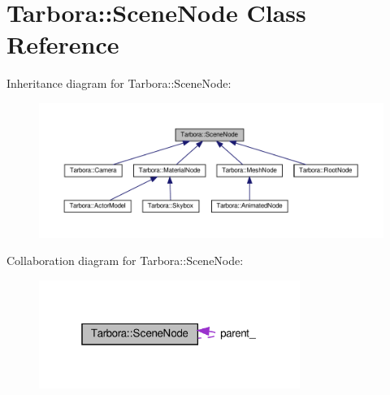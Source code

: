 \hypertarget{classTarbora_1_1SceneNode}{}\section{Tarbora\+:\+:Scene\+Node Class Reference}
\label{classTarbora_1_1SceneNode}


Inheritance diagram for Tarbora\+:\+:Scene\+Node\+:
\nopagebreak
\begin{figure}[H]
\begin{center}
\leavevmode
\includegraphics[width=350pt]{classTarbora_1_1SceneNode__inherit__graph}
\end{center}
\end{figure}


Collaboration diagram for Tarbora\+:\+:Scene\+Node\+:
\nopagebreak
\begin{figure}[H]
\begin{center}
\leavevmode
\includegraphics[width=241pt]{classTarbora_1_1SceneNode__coll__graph}
\end{center}
\end{figure}
